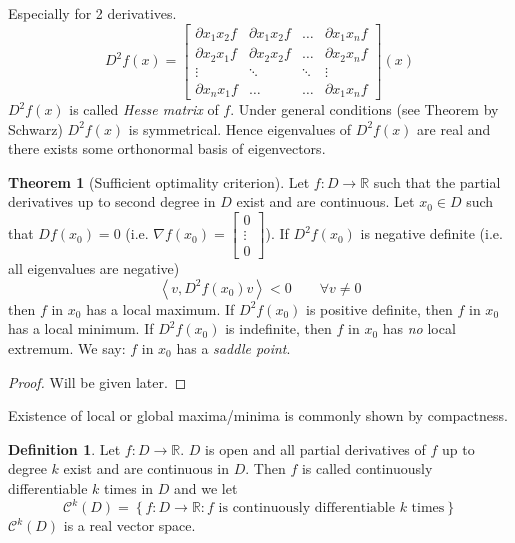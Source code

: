 \documentclass[a4paper,landscape,twocolumn]{article}
\theoremstyle{definition}
\newtheorem{theorem}{Theorem}
\newtheorem{defi}{Definition}
\newcommand\set[1]{\left\{#1\right\}}
\newcommand\fun[1]{\left\langle{#1}\right\rangle}
\begin{document}
Especially for 2 derivatives.
\[
  D^2 f(x) = \begin{bmatrix}
    \partial x_1 x_2 f & \partial x_1 x_2 f & \ldots & \partial x_1 x_n f \\
    \partial x_2 x_1 f & \partial x_2 x_2 f & \ldots & \partial x_2 x_n f \\
    \vdots            & \ddots             & \ddots & \vdots \\
    \partial x_n x_1 f & \ldots            & \ldots & \partial x_1 x_n f
  \end{bmatrix}
  (x)
\]
$D^2 f(x)$ is called \emph{Hesse matrix} of $f$. Under general conditions
(see Theorem by Schwarz) $D^2 f(x)$ is symmetrical. Hence eigenvalues of
$D^2 f(x)$ are real and there exists some orthonormal basis of eigenvectors.

\begin{theorem}[Sufficient optimality criterion]
  Let $f: D \to \mathbb R$ such that the partial derivatives up to second
  degree in $D$ exist and are continuous. Let $x_0 \in D$ such that $Df(x_0) = 0$
  (i.e. $\nabla f(x_0) = \begin{bmatrix} 0 \\ \vdots \\ 0 \end{bmatrix}$).
  If $D^2 f(x_0)$ is negative definite (i.e. all eigenvalues are negative)
  \[ \fun{v, D^2f(x_0) v} < 0 \qquad \forall v \neq 0 \]
  then $f$ in $x_0$ has a local maximum. If $D^2 f(x_0)$ is positive definite,
  then $f$ in $x_0$ has a local minimum. If $D^2 f(x_0)$ is indefinite,
  then $f$ in $x_0$ has \emph{no} local extremum.
  We say: $f$ in $x_0$ has a \emph{saddle point}.
\end{theorem}

\begin{proof}
  Will be given later.
\end{proof}

Existence of local or global maxima/minima is commonly shown by compactness.

\begin{defi}
  Let $f: D \to \mathbb R$. $D$ is open and all partial derivatives of $f$
  up to degree $k$ exist and are continuous in $D$.
  Then $f$ is called continuously differentiable $k$ times in $D$ and
  we let
  \[ \mathcal{C}^k(D) = \set{f: D \to \mathbb R:
    f \text{ is continuously differentiable } k \text{ times}}
  \]
  $\mathcal{C}^k(D)$ is a real vector space.
\end{defi}
\end{document}

